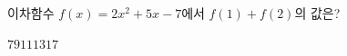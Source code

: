 이차함수 $f(x)=2x^2+5x-7$에서 $f(1)+f(2)$의 값은?
\begin{choices32}{$7$}{$9$}{$11$}{$13$}{$17$}\end{choices32}
